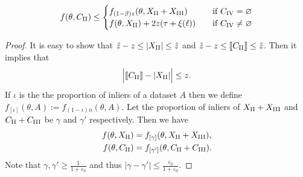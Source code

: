 \begin{lemma}\label{lemma-4}
	\begin{equation}\label{C_II-Bound}
		f(\theta,C_\mathrm{\Rnum{2}})\leq 
		\begin{cases}
			f_{(1-\beta)z}(\theta,X_\mathrm{\Rnum{2}}+X_\mathrm{\Rnum{3}}) \quad& \text{if } C_\mathrm{\Rnum{4}}=\varnothing \\
			f(\theta,X_\mathrm{\Rnum{2}})+2z(\tau+\xi(\ell)) \quad& \text{if } C_\mathrm{\Rnum{4}}\ne\varnothing
		\end{cases}
	\end{equation}
\end{lemma}
\begin{proof}
It is easy to show that
$ \tilde{z}-z \leq \left| X_\mathrm{\Rnum{2}} \right|\leq \tilde{z} $ and $ \tilde{z}-z \leq \left\llbracket C_\mathrm{\Rnum{2}} \right\rrbracket \leq \tilde{z} $.
Then it implies that
\begin{equation}
	\Big| \llbracket C_\mathrm{\Rnum{2}}\rrbracket -|X_\mathrm{\Rnum{2}}| \Big| \leq z.
\end{equation}
If $ \iota $ is the the proportion of inliers of a dataset $ A $ then we define $ f_{[\iota]}(\theta,A):= f_{(1-\iota)n}(\theta,A) $.
Let the proportion of inliers of $ X_\mathrm{\Rnum{2}}+X_\mathrm{\Rnum{3}} $ and $ C_\mathrm{\Rnum{2}}+C_\mathrm{\Rnum{3}} $ be $ \gamma $ and $ \gamma' $ respectively. Then we have
\begin{align}
	f(\theta,X_\mathrm{\Rnum{2}})&= f_{[\gamma]}(\theta,X_\mathrm{\Rnum{2}}+X_\mathrm{\Rnum{3}}),\\
	f(\theta,C_\mathrm{\Rnum{2}})&=f_{[\gamma']}(\theta,C_\mathrm{\Rnum{2}}+C_\mathrm{\Rnum{3}}).
\end{align}
Note that $ \gamma,\gamma'\geq \frac{1}{1+\varepsilon_0} $ and thus $ |\gamma-\gamma'|\leq \frac{\varepsilon_0}{1+\varepsilon_0} $.



\end{proof}
